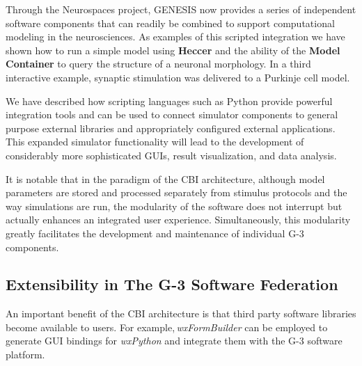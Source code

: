 \documentclass[10pt]{article}
\begin{document}
Through the Neurospaces
project, GENESIS now provides a series of independent software
components that can readily be combined to support computational
modeling in the neurosciences. As examples of this scripted integration we have shown how to run a
simple model using {\bf Heccer} and the ability of the {\bf
  Model\,Container} to query the structure of a neuronal morphology.
In a third interactive example, synaptic stimulation was delivered to
a Purkinje cell model.  

We have described how scripting
languages such as Python provide powerful integration tools
and can be used to connect simulator components to general purpose
external libraries and appropriately configured external applications.
This expanded simulator functionality will lead to the development of
considerably more sophisticated GUIs, result visualization, and data
analysis.

It is notable that in the paradigm of the CBI
architecture, although model parameters are stored and processed separately
from stimulus protocols and the way simulations are run, the modularity of the software does not interrupt but actually enhances an integrated user experience. Simultaneously, this
modularity greatly facilitates the development and maintenance of
individual G-3 components.

\subsection*{Extensibility in The G-3 Software Federation}

An important benefit of the CBI architecture is
that third party software libraries become available to users.  For
example,\,{\it wxFormBuilder} can be employed to generate GUI bindings for
{\it wxPython} and integrate them with the G-3 software platform.
\end{document}
